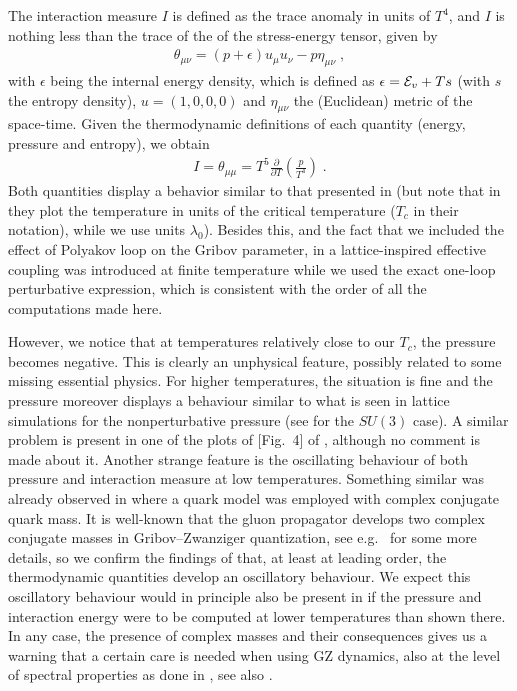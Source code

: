 The interaction measure $I$ is defined as the trace anomaly in units of $T^{4}$, and $I$ is nothing less than the trace of the of the stress-energy
tensor, given by
\begin{eqnarray}
\theta_{\mu\nu} = (p + \epsilon)u_{\mu}u_{\nu} - p\eta_{\mu\nu}\;,
\end{eqnarray}
with $\epsilon$ being the internal energy density, which is defined as $\epsilon = {\cal E}_{v} + Ts$ (with $s$ the entropy density), $u = (1,0,0,0)$ and $\eta_{\mu\nu}$ the (Euclidean) metric of the space-time. Given the thermodynamic definitions of each quantity (energy, pressure and entropy), we obtain
\begin{eqnarray}
I = \theta_{\mu\mu} = T^{5}\frac{\partial}{\partial T}\left(\frac{p}{T^{4}}\right)\;.
\end{eqnarray}
Both quantities display a behavior similar to that presented in \cite{Fukushima:2013xsa} (but note that in they plot the temperature in units of the critical temperature ($T_{c}$ in their notation), while we use units $\lambda_{0}$). Besides this, and the fact that we included the effect of Polyakov loop on the Gribov parameter, in \cite{Fukushima:2013xsa} a lattice-inspired effective coupling was introduced at finite temperature while we used the exact one-loop perturbative expression, which is consistent with the order of all the computations made here.

However, we notice that at temperatures relatively close to our $T_{c}$, the
pressure becomes negative. This is clearly an unphysical feature, possibly
related to some missing essential physics. For higher temperatures, the
situation is fine and the pressure moreover displays a behaviour similar to what is seen
in lattice simulations for the nonperturbative pressure (see \cite{Borsanyi:2012ve} for the
$SU(3)$ case). A similar problem is present in one
of the plots of [Fig.~4] of \cite{Fukushima:2013xsa}, although no comment is made about it. Another strange feature is the oscillating behaviour of both
pressure and interaction measure at low temperatures. Something similar was already observed in
\cite{Benic:2012ec} where a quark model was employed with complex conjugate quark mass. It is
well-known that the gluon propagator develops two complex conjugate masses in Gribov--Zwanziger
quantization, see e.g.~\cite{Dudal:2010cd,Dudal:2013wja,Baulieu:2009ha,Cucchieri:2011ig} for
some more details, so we confirm the findings of \cite{Benic:2012ec} that, at least at leading
order, the thermodynamic quantities develop an oscillatory behaviour. We expect this
oscillatory behaviour would in principle also be present in \cite{Fukushima:2013xsa} if the
pressure and interaction energy were to be computed at lower temperatures than shown there. In
any case, the presence of complex masses and their consequences gives us a warning that a
certain care is needed when using GZ dynamics, also at the level of spectral properties as done
in \cite{Su:2014rma,Florkowski:2015rua}, see also \cite{Baulieu:2008fy,Dudal:2010wn}.

